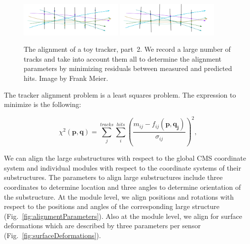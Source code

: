 \begin{figure}[htb]
    \begin{center}
        \includegraphics[width=0.45\textwidth]{../figs/Alignment/toyTracker12.png}
        \includegraphics[width=0.45\textwidth]{../figs/Alignment/toyTracker13.png}
    \end{center}
    \caption{The alignment of a toy tracker, part~2. We record a large number of tracks and take into account them all to determine the alignment parameters by minimizing residuals between measured and predicted hits. Image by Frank Meier.}
    \label{fig:toyTracker_part2}
\end{figure}


The tracker alignment problem is a least squares problem. The expression to minimize is the following:

\begin{equation}
  \chi^2(\mathbf{p},\mathbf{q})=\sum_j^{tracks} \sum_i^{hits} \left( {\frac{m_{ij}-f_{ij}(\mathbf{p},\mathbf{q_j})}{\sigma_{ij}}} \right)^2,
\end{equation}


We can align the large substructures with respect to the global CMS coordinate system and individual modules with respect to the coordinate systems of their substructures. The parameters to align large substructures include three coordinates to determine location and three angles to determine orientation of the substructure. At the module level, we align positions and rotations with respect to the positions and angles of the corresponding large structure (Fig.~\ref{fig:alignmentParameters}). Also at the module level, we align for surface deformations which are described by three parameters per sensor (Fig.~\ref{fig:surfaceDeformations}). 

